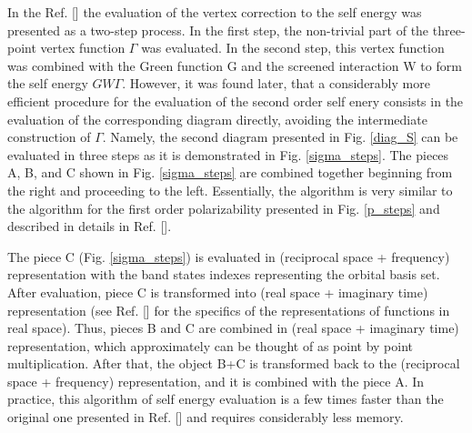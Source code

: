 \documentclass[aps,prb,floatfix,epsfig,twocolumn,preprintnumbers]{revtex4}
\begin{document}
In the Ref. [] the evaluation of the vertex correction to the self energy was presented as a two-step process. In the first step, the non-trivial part of the three-point vertex function $\Gamma$ was evaluated. In the second step, this vertex function was combined with the Green function G and the screened interaction W to form the self energy $GW\Gamma$. However, it was found later, that a considerably more efficient procedure for the evaluation of the second order self enery consists in the evaluation of the corresponding diagram directly, avoiding the intermediate construction of $\Gamma$. Namely, the second diagram presented in Fig. \ref{diag_S} can be evaluated in three steps as it is demonstrated in Fig. \ref{sigma_steps}. The pieces A, B, and C shown in Fig. \ref{sigma_steps} are combined together beginning from the right and proceeding to the left. Essentially, the algorithm is very similar to the algorithm for the first order polarizability presented in Fig. \ref{p_steps} and described in details in Ref. [].




The piece C (Fig. \ref{sigma_steps}) is evaluated in (reciprocal space + frequency) representation with the band states indexes representing the orbital basis set. After evaluation, piece C is transformed into (real space + imaginary time) representation (see Ref. [] for the specifics of the representations of functions in real space). Thus, pieces B and C are combined in (real space + imaginary time) representation, which approximately can be thought of as point by point multiplication. After that, the object B+C is transformed back to the (reciprocal space + frequency) representation, and it is combined with the piece A. In practice, this algorithm of self energy evaluation is a few times faster than the original one presented in Ref. [] and requires considerably less memory.
\end{document}
